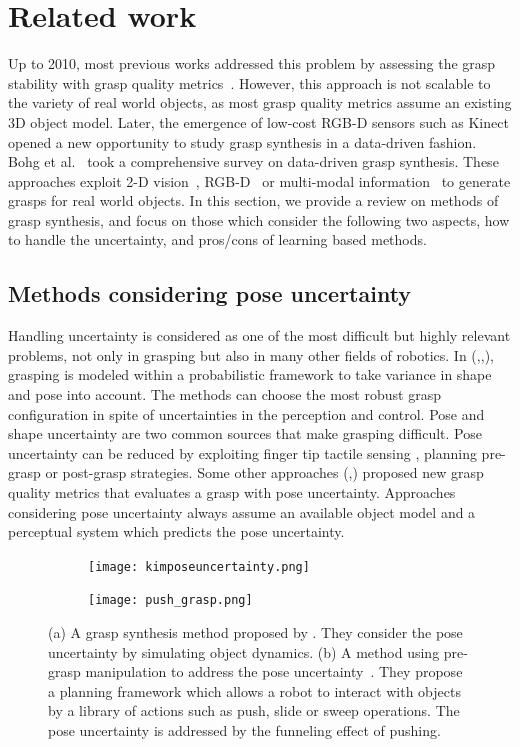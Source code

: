 \section{Related work}
Up to 2010, most previous works addressed this problem by assessing the grasp stability with grasp quality metrics~\cite{Ferrari1992}. However, this approach is not scalable to the variety of real world objects, as most grasp quality metrics assume an existing 3D object model. Later, the emergence of low-cost RGB-D sensors such as Kinect opened a new opportunity to study grasp synthesis in a data-driven fashion. Bohg et al.~\cite{Bohg2014} took a comprehensive survey on data-driven grasp synthesis. These approaches exploit 2-D vision~\cite{Glover2008}, RGB-D~\cite{Berenson2007} or multi-modal information~\cite{Bohg2010} to generate grasps for real world objects. In this section, we provide a review on methods of grasp synthesis, and focus on those which consider the following two aspects, how to handle the uncertainty, and pros/cons of learning based methods. 

\subsection{Methods considering pose uncertainty}
Handling uncertainty is considered as one of the most difficult but highly relevant problems, not only in grasping but also in many other fields of robotics. In (\cite{Goldberg1990},\cite{Hsiao2011},\cite{Chen2015}), grasping is modeled within a probabilistic framework to take variance in shape and pose into account. The methods can choose the most robust grasp configuration in spite of uncertainties in the perception and control. Pose and shape uncertainty are two common sources that make grasping difficult. Pose uncertainty can be reduced by exploiting finger tip tactile sensing \cite{Dang2014}\cite{Felip2009}\cite{Dragiev2013},  planning pre-grasp \cite{Dogar2011}\cite{Brost1988} or post-grasp \cite{Paolini2014} strategies. Some other approaches (\cite{Weisz2012},\cite{Kim2013}) proposed new grasp quality metrics that evaluates a grasp with pose uncertainty. Approaches considering pose uncertainty always assume an available object model and a perceptual system which predicts the pose uncertainty. 
\begin{figure}[!htbp]
    \centering
    \begin{subfigure}[b]{0.48\textwidth}
        \texttt{[image: kimposeuncertainty.png]}
        \caption{}
    \end{subfigure}
    \begin{subfigure}[b]{0.48\textwidth}
        \texttt{[image: push\_grasp.png]}
        \caption{}
    \end{subfigure}
    \caption{(a) A grasp synthesis method proposed by \cite{Kim2013}. They consider the pose uncertainty by  simulating object dynamics. (b) A method using pre-grasp manipulation to address the pose uncertainty~\cite{Dogar2011}. They propose a planning framework which allows a robot to interact with objects by a library of actions such as push, slide or sweep operations. The pose uncertainty is addressed by the funneling effect of pushing.}\label{fig:rw_pose_uncertainty}
\end{figure}


